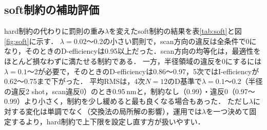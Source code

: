 \documentclass[10.5pt,a4paper]{ltjsarticle}
\begin{document}
\subsection{soft制約の補助評価}
\label{sec:res-soft}

hard制約の代わりに罰則の重み$\lambda$を変えたsoft制約の結果を表\ref{tab:soft}と図\ref{fig:soft}に示す．
$\lambda=0.02$〜0.2の小さい罰則で，scan方向の違反は全条件で0になり，そのときのD-efficiencyは0.95以上だった．scan方向の均等化は，最適性をほとんど損なわずに満たせる制約である．
一方，半径領域の違反を0にするには$\lambda=0.1$〜2が必要で，そのときのD-efficiencyは0.86〜0.97，5次ではI-efficiencyが0.62〜0.75まで下がった．
平均RMSは，4次$N=12$のD基準で$\lambda=0.1$〜0.2（半径の違反2 shot，scan違反0）のとき0.95\,nmと，制約なし（0.99）・違反0（0.97〜0.99）より小さく，制約を少し緩めると最も良くなる場合もあった．
ただし$\lambda$に対する変化は単調でなく（交換法の局所解の影響），運用では$\lambda$を一つ決めて固定するより，hard制約で上下限を設定し直す方が扱いやすい．
\end{document}
